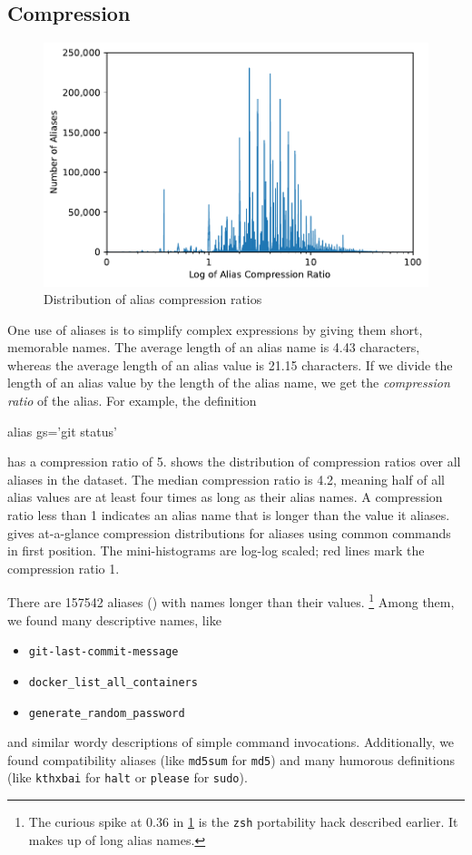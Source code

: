 \subsection{Compression}

\begin{figure}
    \centering
    \includegraphics[width=\columnwidth]{compression_dist.pdf}
    \caption{Distribution of alias compression ratios}
    \label{fig:compression}
\end{figure}

One use of aliases is to simplify complex expressions by giving them short, memorable names.
The average length of an alias name is \num{4.43} characters, whereas the average length of an alias value is \num{21.15} characters.
If we divide the length of an alias value by the length of the alias name, we get the \emph{compression ratio} of the alias.
For example, the definition
\begin{CVerbatim}
alias gs='git status'
\end{CVerbatim}
has a compression ratio of 5.
 shows the distribution of compression ratios over all aliases in the dataset.
The median compression ratio is 4.2, meaning half of all alias values are at least four times as long as their alias names.
A compression ratio less than 1 indicates an alias name that is longer than the value it aliases.
 gives at-a-glance compression distributions for aliases using common commands in first position.
The mini-histograms are log-log scaled; red lines mark the compression ratio 1.

There are \num{157542} aliases () with names longer than their values.%
\footnote{The curious spike at 0.36 in \cref{fig:compression} is the \texttt{zsh} portability hack described earlier.
It makes up  of long alias names.}
Among them, we found many descriptive names, like
\begin{itemize}
    \item \verb|git-last-commit-message|
    \item \verb|docker_list_all_containers|
    \item \verb|generate_random_password|
\end{itemize}
and similar wordy descriptions of simple command invocations.
Additionally, we found compatibility aliases (like \texttt{md5sum} for \texttt{md5}) and many humorous definitions (like \texttt{kthxbai} for \texttt{halt} or \texttt{please} for \texttt{sudo}).

